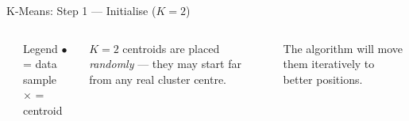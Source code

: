 \documentclass{beamer}
\newcommand{\plotcanvas}{%
  \draw[bordercol, fill=white, line width=1pt]
    (-2.8,-2.2) rectangle (3.6,2.8);
  \foreach \x in {-2,-1,0,1,2,3}
    \draw[bordercol!40, very thin] (\x,-2.2) -- (\x,2.8);
  \foreach \y in {-2,-1,0,1,2}
    \draw[bordercol!40, very thin] (-2.8,\y) -- (3.6,\y);
}
\newcommand{\bluesamples}{%
  \foreach \x/\y in {-1.8/1.8,-1.4/2.0,-1.6/1.4,-2.0/1.6,-1.3/1.2,
                     -1.9/1.0,-1.5/1.6,-1.2/1.8,-2.1/1.3,-1.7/2.2}
    \node[sample=clustblue] at (\x,\y) {};%
}
\newcommand{\redsamples}{%
  \foreach \x/\y in {1.8/-0.8,2.2/-0.6,2.0/-1.2,2.5/-0.9,1.6/-1.1,
                     2.3/-1.4,1.9/-0.5,2.6/-1.1,2.1/-1.6,1.7/-0.7}
    \node[sample=clustred] at (\x,\y) {};%
}
\begin{document}
\begin{frame}{K-Means: Step 1 — Initialise ($K=2$)}

\begin{columns}[c]
\begin{center}
\end{center}

\begin{block}{Legend}
  \textbf{$\bullet$} = data sample\\[4pt]
  \textbf{$\times$} = centroid
\end{block}

\medskip
\textbf{$K=2$} centroids are placed \emph{randomly} — they may start far from any real cluster centre.

\medskip
The algorithm will move them iteratively to better positions.
\end{columns}

\end{frame}
\end{document}
